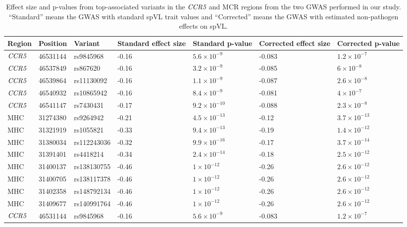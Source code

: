 \documentclass[]{article}
\begin{document}
\begin{table}[ht]
\caption{Effect size and p-values from top-associated variants in the $\emph{CCR5}$ and MCR regions from the two GWAS performed in our study. ``Standard'' means the GWAS with standard spVL trait values and ``Corrected'' means the GWAS with estimated non-pathogen effects on spVL.}
\begin{tabular}{lllP{2.2cm}P{2.2cm}P{1.6cm}P{2.2cm}}
  \hline
    Region & Position & Variant & Standard effect size & Standard p-value & Corrected effect size & Corrected p-value \\ 
  \hline
    $\emph{CCR5}$ & 46531144 & rs9845968 & -0.16 & $5.6 \times 10^{-9}$ & -0.083 & $1.2 \times 10^{-7}$ \\ 
    $\emph{CCR5}$ & 46537849 & rs867620 & -0.16 & $3.2 \times 10^{-9}$ & -0.085 & $6 \times 10^{-8}$ \\ 
    $\emph{CCR5}$ & 46539864 & rs11130092 & -0.16 & $1.1 \times 10^{-9}$ & -0.087 & $2.6 \times 10^{-8}$ \\ 
    $\emph{CCR5}$ & 46540932 & rs10865942 & -0.16 & $8.4 \times 10^{-9}$ & -0.081 & $4 \times 10^{-7}$ \\ 
    $\emph{CCR5}$ & 46541147 & rs7430431 & -0.17 & $9.2 \times 10^{-10}$ & -0.088 & $2.3 \times 10^{-8}$ \\ 
    MHC & 31274380 & rs9264942 & -0.21 & $4.5 \times 10^{-13}$ & -0.12 & $3.7 \times 10^{-13}$ \\ 
    MHC & 31321919 & rs1055821 & -0.33 & $9.4 \times 10^{-13}$ & -0.19 & $1.4 \times 10^{-12}$ \\ 
    MHC & 31380034 & rs112243036 & -0.32 & $9.9 \times 10^{-16}$ & -0.17 & $3.7 \times 10^{-14}$ \\ 
    MHC & 31391401 & rs4418214 & -0.34 & $2.4 \times 10^{-14}$ & -0.18 & $2.5 \times 10^{-12}$ \\ 
    MHC & 31400137 & rs138130755 & -0.46 & $1 \times 10^{-12}$ & -0.26 & $2.6 \times 10^{-12}$ \\ 
    MHC & 31400705 & rs138117378 & -0.46 & $1 \times 10^{-12}$ & -0.26 & $2.6 \times 10^{-12}$ \\ 
    MHC & 31402358 & rs148792134 & -0.46 & $1 \times 10^{-12}$ & -0.26 & $2.6 \times 10^{-12}$ \\ 
    MHC & 31409677 & rs140991764 & -0.46 & $1 \times 10^{-12}$ & -0.26 & $2.6 \times 10^{-12}$ \\ 
    $\emph{CCR5}$ & 46531144 & rs9845968 & -0.16 & $5.6 \times 10^{-9}$ & -0.083 & $1.2 \times 10^{-7}$ \\ 

\end{tabular}
\end{table}
\end{document}
